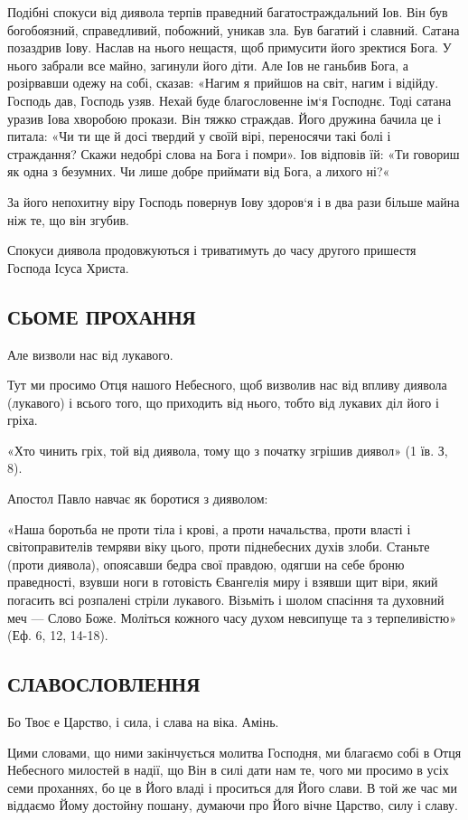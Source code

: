 \documentclass[main.tex]{subfiles}
\begin{document}
Подібні спокуси від диявола терпів праведний багатостраждальний Іов. Він був богобоязний, справедливий, побожний, уникав зла. Був багатий і славний. Сатана позаздрив Іову. Наслав на нього нещастя, щоб примусити його зректися Бога. У нього забрали все майно, загинули його діти. Але Іов не ганьбив Бога, а розірвавши одежу на собі, сказав: «Нагим я прийшов на світ, нагим і відійду. Господь дав, Господь узяв. Нехай буде благословенне ім`я Господнє. Тоді сатана уразив Іова хворобою прокази. Він тяжко страждав. Його дружина бачила це і питала: «Чи ти ще й досі твердий у своїй вірі, переносячи такі болі і страждання? Скажи недобрі слова на Бога і помри». Іов відповів їй: «Ти говориш як одна з безумних. Чи лише добре приймати від Бога, а лихого ні?«

За його непохитну віру Господь повернув Іову здоров`я і в два рази більше майна ніж те, що він згубив.

Спокуси диявола продовжуються і триватимуть до часу другого пришестя Господа Ісуса Христа.

\subsection{СЬОМЕ ПРОХАННЯ}
Але визволи нас від лукавого.

Тут ми просимо Отця нашого Небесного, щоб визволив нас від впливу диявола (лукавого) і всього того, що приходить від нього, тобто від лукавих діл його і гріха.

«Хто чинить гріх, той від диявола, тому що з початку згрішив диявол» (1 їв. З, 8).

Апостол Павло навчає як боротися з дияволом:

«Наша боротьба не проти тіла і крові, а проти начальства, проти власті і світоправителів темряви віку цього, проти піднебесних духів злоби. Станьте (проти диявола), опоясавши бедра свої правдою, одягши на себе броню праведності, взувши ноги в готовість Євангелія миру і взявши щит віри, який погасить всі розпалені стріли лукавого. Візьміть і шолом спасіння та духовний меч — Слово Боже. Моліться кожного часу духом невсипуще та з терпеливістю» (Еф. 6, 12, 14-18).

\subsection{СЛАВОСЛОВЛЕННЯ}

Бо Твоє е Царство, і сила, і слава на віка. Амінь.

Цими словами, що ними закінчується молитва Господня, ми благаємо собі в Отця Небесного милостей в надії, що Він в силі дати нам те, чого ми просимо в усіх семи проханнях, бо це в Його владі і проситься для Його слави. В той же час ми віддаємо Йому достойну пошану, думаючи про Його вічне Царство, силу і славу.
\end{document}

